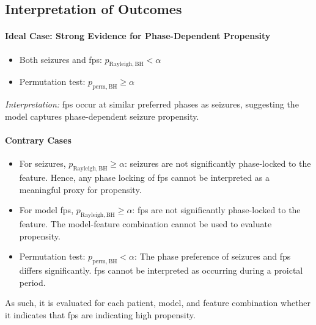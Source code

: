 \subsection{Interpretation of Outcomes} \label{subsec:interpretation-of-outcomes}
\paragraph{Ideal Case: Strong Evidence for Phase-Dependent Propensity}
\begin{itemize}
    \item Both seizures and \glspl{fp}: $p_{\mathrm{Rayleigh, BH}} < \alpha$
    \item Permutation test: $p_{\mathrm{perm, BH}} \geq \alpha$
\end{itemize}
\textit{Interpretation:} \Glspl{fp} occur at similar preferred phases as seizures, suggesting the model captures phase-dependent seizure propensity.

\paragraph{Contrary Cases}
\begin{itemize}
    \item For seizures, $p_{\mathrm{Rayleigh, BH}} \geq \alpha$: seizures are not significantly phase-locked to the feature.
    Hence, any phase locking of \glspl{fp} cannot be interpreted as a meaningful proxy for propensity.
    \item For model \glspl{fp}, $p_{\mathrm{Rayleigh, BH}} \geq \alpha$: \glspl{fp} are not significantly phase-locked to the feature.
    The model-feature combination cannot be used to evaluate propensity.
    \item Permutation test: $p_{\mathrm{perm, BH}} < \alpha$: The phase preference of seizures and \glspl{fp} differs significantly.
    \Glspl{fp} cannot be interpreted as occurring during a proictal period.
\end{itemize}

As such, it is evaluated for each patient, model, and feature combination whether it indicates that \glspl{fp} are indicating high propensity.